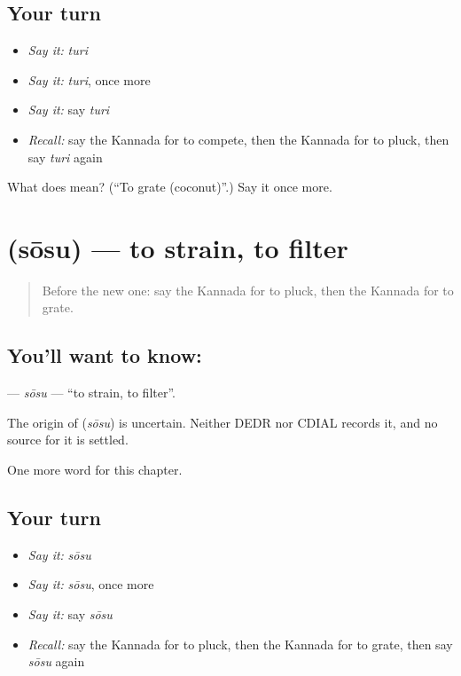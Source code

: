 \subsection*{Your turn}
\begin{itemize}
\raggedright
  \item \emph{Say it:} \emph{turi}
  \item \emph{Say it:} \emph{turi}, once more
  \item \emph{Say it:} say \emph{turi}
  \item \emph{Recall:} say the Kannada for to compete, then the Kannada for to pluck, then say \emph{turi} again
\end{itemize}

\begin{tcolorbox}[breakable,colback=teal!4,colframe=teal!35!black,title={Before you move on}]
What does  mean? (\textquotedblleft{}To grate (coconut)\textquotedblright{}.) Say it once more.
\end{tcolorbox}
\section[\texorpdfstring{\kn{ಸೋಸು} (sōsu)}{ಸೋಸು (sōsu)}]{ (sōsu) — to strain, to filter}

\label{lesson:KA-C205-sosu}



\begin{quote}
Before the new one: say the Kannada for to pluck, then the Kannada for to grate.
\end{quote}

\subsection*{You'll want to know: }
\textbf{} — \emph{sōsu} — \textquotedblleft{}to strain, to filter\textquotedblright{}.

\begin{cousinweb}
The origin of \textbf{} (\emph{sōsu}) is uncertain. Neither DEDR nor CDIAL records it, and no source for it is settled.
\end{cousinweb}

\begin{grammarlens}[title={What you've built}]
One more word for this chapter.
\end{grammarlens}

\subsection*{Your turn}
\begin{itemize}
\raggedright
  \item \emph{Say it:} \emph{sōsu}
  \item \emph{Say it:} \emph{sōsu}, once more
  \item \emph{Say it:} say \emph{sōsu}
  \item \emph{Recall:} say the Kannada for to pluck, then the Kannada for to grate, then say \emph{sōsu} again
\end{itemize}

